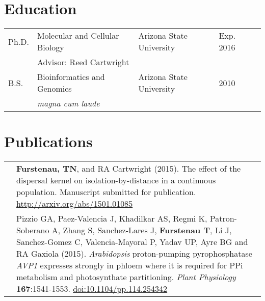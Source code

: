 \documentclass[11pt]{article}
\begin{document}
\section*{Education}
\begin{tabular}[c]{lllll}
Ph.D.& Molecular and Cellular Biology& Arizona State University&Exp. 2016\\
&\multicolumn{3}{l}{Advisor: Reed Cartwright}\\
B.S.&Bioinformatics and Genomics&Arizona State University& 2010\\
&\multicolumn{3}{l}{\textit{magna cum laude}}
\end{tabular}
\section*{Publications}
\renewcommand{\arraystretch}{1.5}
\begin{tabularx}{\linewidth}{l X}
&\textbf{Furstenau, TN}, and RA Cartwright (2015). The effect of the dispersal kernel on isolation-by-distance in a continuous population. Manuscript submitted for publication. \href{http://arxiv.org/abs/1501.01085}{http://arxiv.org/abs/1501.01085}\\
&Pizzio GA, Paez-Valencia J, Khadilkar AS, Regmi K, Patron-Soberano A, Zhang S, Sanchez-Lares J, \textbf{Furstenau T}, Li J, Sanchez-Gomez C, Valencia-Mayoral P, Yadav UP, Ayre BG and RA Gaxiola (2015).\textit{ Arabidopsis} proton-pumping pyrophosphatase \textit{AVP1} expresses strongly in phloem where it is required for PPi metabolism and photosynthate partitioning. \textit{Plant Physiology} \textbf{167}:1541-1553. \href{http:/​/​dx.​doi.​org/​10.​1104/​pp.​114.​254342}{doi:10.1104/pp.114.254342}\\
\end{tabularx}
\end{document}
